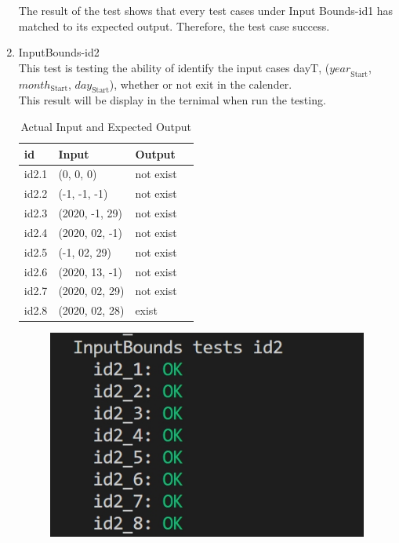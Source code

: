 \documentclass[12pt, titlepage]{article}
\begin{document}
\begin{enumerate}
The result of the test shows that every test cases under Input Bounds-id1 has matched to its expected output. Therefore, the test case success.

\item{InputBounds-id2\\} 
This test is testing the ability of identify the input cases dayT, ($\mathit{year}_\text{Start}$, $\mathit{month}_\text{Start}$, $\mathit{day}_\text{Start}$), whether or not exit in the calender.\\
This result will be display in the ternimal when run the testing.


\begin{table}[h!]
\centering
\noindent \begin{tabular}{l l l l} 
    \toprule		
    \textbf{id} & \textbf{Input} & \textbf{Output}\\ 
	\midrule
   id2.1 & (0, 0, 0) & not exist\\
   id2.2 & (-1, -1, -1)  & not exist\\
   id2.3 & (2020, -1, 29)  & not exist\\
   id2.4 & (2020, 02, -1)  & not exist\\
   id2.5 & (-1, 02, 29)  & not exist\\
   id2.6 & (2020, 13, -1)  & not exist\\
   id2.7 & (2020, 02, 29)  & not exist\\
   id2.8 & (2020, 02, 28)  & exist\\
    \bottomrule
  \end{tabular}
\caption{Actual Input and Expected Output}
\end{table}


\begin{figure}[hbt!]
 \centering
 \includegraphics[scale=.5]{InputBounds-id2}
\end{figure}


\end{enumerate}
\end{document}
